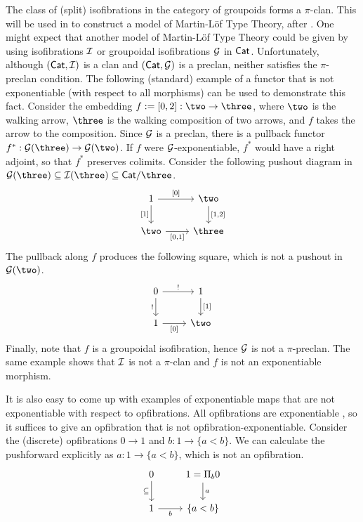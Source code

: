 \begin{example}
  The class of (split) isofibrations in the category of groupoids forms a $\pi$-clan.
  This will be used in  to construct a model of Martin-L\"of Type Theory,
  after \cite{hofmann1995}.
  One might expect that another model of Martin-L\"of Type Theory
  could be given by using isofibrations $\mathcal{I}$ or groupoidal isofibrations $\mathcal{G}$ in $\mathsf{Cat}$.
  Unfortunately, although $(\mathsf{Cat},\mathcal{I})$ is a clan and $(\mathsf{Cat},\mathcal{G})$ is a preclan,
  neither satisfies the $\pi$-preclan condition.
  The following (standard) example of a functor that is not
  exponentiable (with respect to all morphisms) can be used to demonstrate this fact.
  Consider the embedding $f := [0,2] : \two \to \three$,
  where $\two$ is the walking arrow,
  $\three$ is the walking composition of two arrows,
  and $f$ takes the arrow to the composition.
  Since $\mathcal{G}$ is a preclan,
  there is a pullback functor $f^* : \GG(\three) \to \GG(\two)$.
  If $f$ were $\mathcal{G}$-exponentiable, $f^*$ would have a right adjoint,
  so that $f^*$ preserves colimits.
  Consider the following pushout diagram in $\GG(\three) \subseteq \II(\three) \subseteq \Cat / \three$.
  \[
    \begin{tikzcd}
      1 & \two \\
      \two & \three
      \arrow["{[0]}", from=1-1, to=1-2]
      \arrow["{[1]}"', from=1-1, to=2-1]
      \arrow["{[1,2]}", from=1-2, to=2-2]
      \arrow["{[0,1]}"', from=2-1, to=2-2]
    \end{tikzcd}
  \]
  The pullback along $f$ produces the following square, which is not a pushout in $\GG(\two)$.
  \[
    \begin{tikzcd}
      0 & 1 \\
      1 & \two
      \arrow["{!}", from=1-1, to=1-2]
      \arrow["{!}"', from=1-1, to=2-1]
      \arrow["{[1]}", from=1-2, to=2-2]
      \arrow["{[0]}"', from=2-1, to=2-2]
    \end{tikzcd}
  \]
  Finally, note that $f$ is a groupoidal isofibration,
  hence $\mathcal{G}$ is not a $\pi$-preclan.
  The same example shows that $\mathcal{I}$ is not a $\pi$-clan and $f$ is not an exponentiable morphism.

  It is also easy to come up with examples of exponentiable maps that are not
  exponentiable with respect to opfibrations.
  All opfibrations are exponentiable \cite{giraud1964,vidmar2018},
  so it suffices to give an opfibration that is not opfibration-exponentiable.
  Consider the (discrete) opfibrations $0 \to 1$ and $b : 1 \to \{a < b\}$.
  We can calculate the pushforward explicitly as $a : 1 \to \{a < b\}$,
  which is not an opfibration.
  \[ \begin{tikzcd}
    0 & {1 = \Pi_b 0} \\
    1 & {\{a < b\}}
    \arrow["\subseteq"', from=1-1, to=2-1]
    \arrow["a", from=1-2, to=2-2]
    \arrow["b"', from=2-1, to=2-2]
  \end{tikzcd}\]
\end{example}